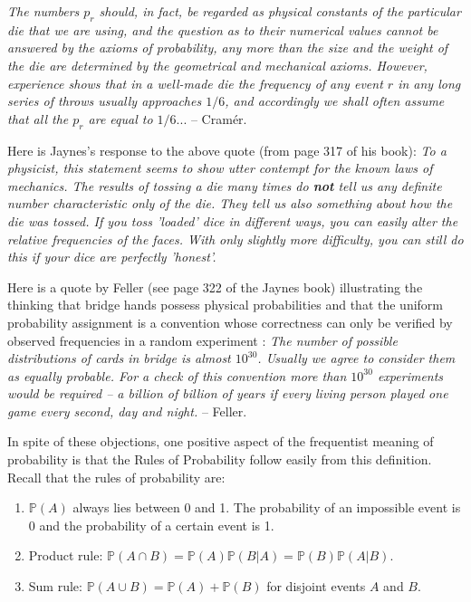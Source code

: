 \documentclass{scrartcl}
\renewcommand{\P}{{\mathbb P}}
\begin{document}
\textit{The numbers $p_r$ should, in fact, be regarded as physical constants of the particular
  die that we are using, and the question as to their numerical values
  cannot be answered by the axioms of probability, any more than the
  size and the weight of the die are determined by the geometrical and
  mechanical axioms. However, experience shows that in a well-made die
  the frequency of any event $r$ in any long series of throws usually
  approaches $1/6$, and accordingly we shall often assume that all the
  $p_r$ are equal to $1/6$}... -- Cram{\'e}r.

  Here is Jaynes's response to the above quote (from page 317 of his
  book): \textit{To a physicist, this statement seems to show utter contempt
  for the known laws of mechanics. The results of tossing a die many
  times do \textbf{not} tell us any definite number characteristic
  only of the die. They tell us also something about how the die was
  tossed. If you toss 'loaded' dice in different ways, you can easily
  alter the relative frequencies of the faces. With only slightly more
  difficulty, you can still do this if your dice are perfectly
  'honest'.}

  Here is a quote by Feller (see page 322 of the Jaynes book)
  illustrating the thinking that bridge hands possess physical
  probabilities and that the uniform probability assignment is a
  convention whose correctness can only be verified by observed
  frequencies in a random experiment : \textit{The number of possible
    distributions of cards in bridge is almost $10^{30}$. Usually we
    agree to consider them as equally probable. For a check of this
    convention more than $10^{30}$ experiments would be required -- a
    billion of billion of years if every living person played one game
    every second, day and night.} -- Feller. 

In spite of these objections, one positive aspect of the frequentist
meaning of probability is that the Rules of Probability follow easily
from this definition. Recall that the rules of probability are: 
\begin{enumerate}
\item $\P(A)$ always  lies between 0 and 1. The probability of an
  impossible event is 0 and the probability of a certain event is 1.
\item Product rule: $\P(A \cap B) = \P(A) \P(B|A) = \P(B) \P(A|B)$.
\item Sum rule: $\P(A \cup B) = \P(A) + \P(B)$ for disjoint events $A$
  and $B$. 
\end{enumerate}
\end{document}
